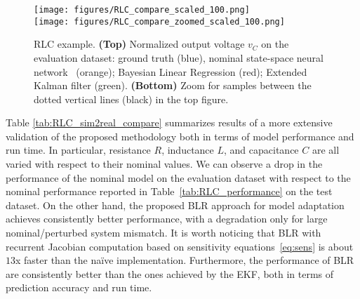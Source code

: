 \documentclass{article}
\begin{document}
\begin{table*}
{\begin{tabular}{c | c | c  c | c  c | c  c | c c c}
\hline
\end{tabular}%
}
\caption{RLC example. ($i$) $R^2$ performance index on evaluation dataset achieved by: nominal model; Bayesian Linear Regression; Extended Kalman Filter; complete retraining from transfer dataset after full convergence and after $15$ seconds of training;  ($ii$) CPU time T required to compute adapted models through: Bayesian Linear Regression with na{\"i}ve and sensitivity-based (eq.~\eqref{eq:sens}) computation of  the Jacobian; Extended Kalman Filter; full retraining.}
\label{tab:RLC_sim2real_compare}
\end{table*}


\begin{figure}%
    \centering
\texttt{[image: figures/RLC\_compare\_scaled\_100.png]}\\
\texttt{[image: figures/RLC\_compare\_zoomed\_scaled\_100.png]}
    \caption{RLC example. \textbf{(Top)} Normalized output voltage $v_C$ on the evaluation dataset: ground truth (blue), nominal state-space neural network~\cite{forgione2021continuous} (orange); Bayesian Linear Regression (red); Extended Kalman filter (green).
    \textbf{(Bottom)} Zoom for samples between the dotted vertical lines (black) in the top figure.}
    \label{RLC-prediction-compare-zoom}
\end{figure}

Table \ref{tab:RLC_sim2real_compare} summarizes results of a more extensive validation of the proposed methodology  both in terms of model performance and run time. In particular,  resistance $R$, inductance $L$, and capacitance $C$ are all varied with respect to their nominal values.    
We can observe a drop in the performance of the nominal model on the evaluation dataset with respect to the nominal  performance reported in Table~\ref{tab:RLC_performance} on the test dataset. On the other hand, the proposed  BLR approach for model adaptation achieves consistently better performance, with a  degradation only for large nominal/perturbed system mismatch. It is worth noticing that BLR with recurrent Jacobian computation based on sensitivity equations~\eqref{eq:sens} is about $13$x faster than the na{\"i}ve implementation. 
Furthermore, the performance of BLR are consistently better than the ones achieved by the EKF, both in terms of prediction accuracy and run time. 
\end{document}
